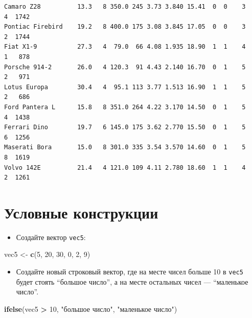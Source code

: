 \documentclass[
]{book}
\newenvironment{Shaded}{\begin{snugshade}}{\end{snugshade}}
\newcommand{\DecValTok}[1]{\textcolor[rgb]{0.00,0.00,0.81}{#1}}
\newcommand{\KeywordTok}[1]{\textcolor[rgb]{0.13,0.29,0.53}{\textbf{#1}}}
\newcommand{\NormalTok}[1]{#1}
\newcommand{\OperatorTok}[1]{\textcolor[rgb]{0.81,0.36,0.00}{\textbf{#1}}}
\newcommand{\StringTok}[1]{\textcolor[rgb]{0.31,0.60,0.02}{#1}}
\providecommand{\tightlist}{%
  \setlength{\itemsep}{0pt}\setlength{\parskip}{0pt}}
\begin{document}
\begin{verbatim}
Camaro Z28          13.3   8 350.0 245 3.73 3.840 15.41  0  0    3    4  1742
Pontiac Firebird    19.2   8 400.0 175 3.08 3.845 17.05  0  0    3    2  1744
Fiat X1-9           27.3   4  79.0  66 4.08 1.935 18.90  1  1    4    1   878
Porsche 914-2       26.0   4 120.3  91 4.43 2.140 16.70  0  1    5    2   971
Lotus Europa        30.4   4  95.1 113 3.77 1.513 16.90  1  1    5    2   686
Ford Pantera L      15.8   8 351.0 264 4.22 3.170 14.50  0  1    5    4  1438
Ferrari Dino        19.7   6 145.0 175 3.62 2.770 15.50  0  1    5    6  1256
Maserati Bora       15.0   8 301.0 335 3.54 3.570 14.60  0  1    5    8  1619
Volvo 142E          21.4   4 121.0 109 4.11 2.780 18.60  1  1    4    2  1261
\end{verbatim}

\hypertarget{solution_if}{%
\section{Условные конструкции}\label{solution_if}}

\begin{itemize}
\tightlist
\item
  Создайте вектор \texttt{vec5}:
\end{itemize}

\begin{Shaded}
\begin{Highlighting}[]
\NormalTok{vec5 <-}\StringTok{ }\KeywordTok{c}\NormalTok{(}\DecValTok{5}\NormalTok{, }\DecValTok{20}\NormalTok{, }\DecValTok{30}\NormalTok{, }\DecValTok{0}\NormalTok{, }\DecValTok{2}\NormalTok{, }\DecValTok{9}\NormalTok{)}
\end{Highlighting}
\end{Shaded}

\begin{itemize}
\tightlist
\item
  Создайте новый строковый вектор, где на месте чисел больше 10 в \texttt{vec5} будет стоять ``большое число'', а на месте остальных чисел --- ``маленькое число''.
\end{itemize}

\begin{Shaded}
\begin{Highlighting}[]
\KeywordTok{ifelse}\NormalTok{(vec5 }\OperatorTok{>}\StringTok{ }\DecValTok{10}\NormalTok{, }\StringTok{"большое число"}\NormalTok{, }\StringTok{"маленькое число"}\NormalTok{)}
\end{Highlighting}
\end{Shaded}
\end{document}
